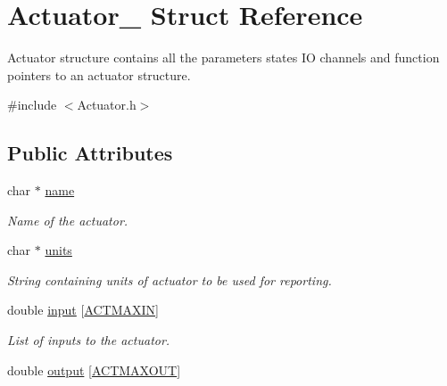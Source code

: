 \hypertarget{struct_actuator__}{}\section{Actuator\+\_\+ Struct Reference}
\label{struct_actuator__}


Actuator structure contains all the parameters states IO channels and function pointers to an actuator structure.  




{\ttfamily \#include $<$Actuator.\+h$>$}

\subsection*{Public Attributes}
\begin{DoxyCompactItemize}
\item 
\mbox{\label{struct_actuator___a36e00b42ebb484c40934d26848b6e662}} 
char $\ast$ \hyperlink{struct_actuator___a36e00b42ebb484c40934d26848b6e662}{name}
\begin{DoxyCompactList}\small\item\em Name of the actuator. \end{DoxyCompactList}\item 
\mbox{\label{struct_actuator___a8964fb4f29d5c906e628501c51171d60}} 
char $\ast$ \hyperlink{struct_actuator___a8964fb4f29d5c906e628501c51171d60}{units}
\begin{DoxyCompactList}\small\item\em String containing units of actuator to be used for reporting. \end{DoxyCompactList}\item 
\mbox{\label{struct_actuator___ac01c2006287f95e953c584b49789cf91}} 
double \hyperlink{struct_actuator___ac01c2006287f95e953c584b49789cf91}{input} \mbox{[}\hyperlink{_actuator_8h_a51f2ad8e0c5ac16d2715f9cf94c4dd58}{A\+C\+T\+M\+A\+X\+IN}\mbox{]}
\begin{DoxyCompactList}\small\item\em List of inputs to the actuator. \end{DoxyCompactList}\item 
\mbox{\label{struct_actuator___a651185d83dff257353d7ed425b8f2f47}} 
double \hyperlink{struct_actuator___a651185d83dff257353d7ed425b8f2f47}{output} \mbox{[}\hyperlink{_actuator_8h_ac9f353fdc4ab6ddd068b877c797d08a2}{A\+C\+T\+M\+A\+X\+O\+UT}\mbox{]}

\end{DoxyCompactItemize}
